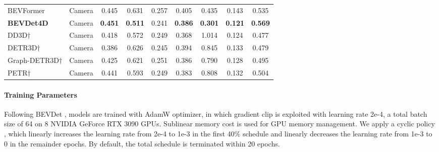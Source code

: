 \documentclass[10pt,twocolumn,letterpaper]{article}
\begin{document}
\begin{table*}[t]
{\begin{tabular}{l|c|ccccccc}
    BEVFormer \cite{BEVFormer}   & Camera   & 0.445         & 0.631              & 0.257             & 0.405             & 0.435             & 0.143             & 0.535          \\
    \textbf{BEVDet4D}            & Camera   & \textbf{0.451}& \textbf{0.511}     & 0.241             & \textbf{0.386}    & \textbf{0.301}    & \textbf{0.121}    & \textbf{0.569}\\
    \hline
    DD3D$\dag$ \cite{DD3D}       & Camera   & 0.418         & 0.572              & 0.249             & 0.368             & 1.014             & 0.124             & 0.477          \\
    DETR3D$\dag$ \cite{DETR3D}   & Camera   & 0.386         & 0.626              & 0.245             & 0.394             & 0.845             & 0.133             & 0.479          \\
    Graph-DETR3D$\dag$ \cite{Graph-DETR3D}& Camera   & 0.425         & 0.621     & 0.251             & 0.386             & 0.790             & 0.128             & 0.495          \\
    PETR$\dag$ \cite{PETR}       & Camera   & 0.441         & 0.593              & 0.249             & 0.383             & 0.808             & 0.132             & 0.504          \\
    \hline

    \hline
    \end{tabular}}
  \label{tab:nus-test}\end{table*}

\paragraph{Training Parameters}
Following BEVDet \cite{BEVDet}, models are trained with AdamW \cite{AdamW} optimizer, in which gradient clip is exploited with learning rate 2e-4, a total batch size of 64 on 8 NVIDIA GeForce RTX 3090 GPUs. Sublinear memory cost \cite{SMC} is used for GPU memory management. We apply a cyclic policy \cite{Second}, which linearly increases the learning rate from 2e-4 to 1e-3 in the first 40\% schedule and linearly decreases the learning rate from 1e-3 to 0 in the remainder epochs. By default, the total schedule is terminated within 20 epochs.
\end{document}
